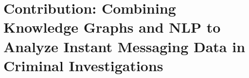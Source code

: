 \section{Contribution: Combining Knowledge Graphs and NLP to Analyze Instant Messaging Data in Criminal Investigations}